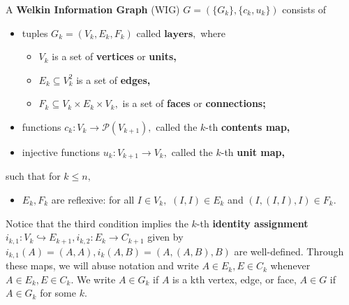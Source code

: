 

 \begin{definition} A \textbf{Welkin Information Graph} (WIG) $G = (\{G_{k}\}, \{c_{k}, u_{k}\})$ consists of
   \begin{itemize}
     \item tuples $G_{k} = (V_{k}, E_{k}, F_{k})$ called $\textbf{layers},$ where
           \begin{itemize}
             \item $V_{k}$ is a set of \textbf{vertices} or \textbf{units,}
             \item $E_{k} \subseteq V_{k}^{2}$ is a set of \textbf{edges,}
             \item $F_{k} \subseteq V_{k} \times E_{k} \times V_{k},$ is a set of \textbf{faces} or \textbf{connections;}
           \end{itemize}
     \item functions $c_{k}: V_{k} \to \mathcal{P}(V_{k+1}),$ called the $k$-th \textbf{contents map,}
     \item injective functions $u_{k}: V_{k+1} \to V_{k},$ called the $k$-th \textbf{unit map,}
   \end{itemize}
   such that for $k \leq n,$
    \begin{itemize}
    \item $E_{k}, F_{k}$ are reflexive: for all $I \in V_{k},$
            $(I, I) \in E_{k}$ and $(I, (I, I), I) \in F_{k}.$
    \end{itemize}
    \end{definition}

    Notice that the third condition implies the $k$-th \textbf{identity assignment} $i_{k, 1}: V_{k} \hookrightarrow E_{k+1}, i_{k, 2}: E_{k} \to C_{k+1}$ given by $i_{k, 1}(A) = (A, A), i_{k}(A, B) = (A, (A, B), B)$ are well-defined. Through these maps, we will abuse notation and write $A \in E_{k}, E \in C_{k}$ whenever $A \in E_{k}, E \in C_{k}.$ We write $A \in G_{k}$ if $A$ is a kth vertex, edge, or face, $A \in G$ if $A \in G_{k}$ for some $k.$

